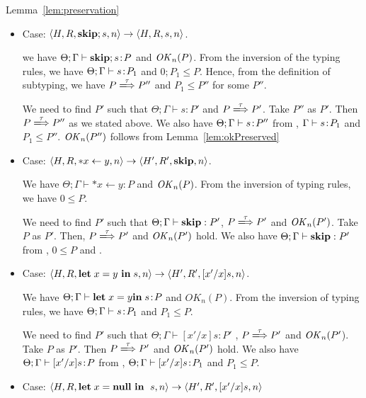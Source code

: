 \begin{pfof}{Lemma~\ref{lem:preservation}}
\begin{itemize}
\item Case: $\langle H, R, \mathbf{skip};s, n \rangle \rightarrow \langle
  H, R, s, n \rangle $.

  we have \(\Theta;\Gamma \vdash \mathbf{skip};s\!:\!  P\) and
  \(\mathit{OK}_{n}(P)\). From the inversion of the typing rules, we have
  \(\Theta; \Gamma \vdash s\!:\! P_{1}\) and \(0;P_{1} \le
  P\). Hence, from the definition of subtyping, we have \(P
  \xLongrightarrow{\tau} P''\) and \(P_{1} \le P''\) for some \(P''\).

  We need to find \(P'\) such that \(\Theta; \Gamma \vdash s : P'\)
  and \(P \xLongrightarrow{\tau} P'\). Take \(P''\) as \(P'\). Then \(P
  \xLongrightarrow{\tau} P''\) as we stated above. We also have
  \(\Theta;\Gamma \vdash s\!:\! P''\) from , \(\Gamma \vdash
  s\!:\! P_{1}\) and \(P_{1} \le P''\). \(\mathit{OK}_n(P'')\) follows from
  Lemma~\ref{lem:okPreserved}

\item Case: $\langle H, R, *x \leftarrow y , n \rangle \rightarrow
  \langle H', R', \mathbf{skip}, n \rangle $.

  We have \(\Theta; \Gamma \vdash *x \leftarrow y : P\) and
  \(\mathit{OK}_{n}(P)\). From the inversion of typing rules, we have \(0 \le
  P\).

  We need to find $P'$ such that \(\Theta; \Gamma \vdash \mathbf{skip}: P'\),
  \(P \xLongrightarrow{\tau} P'\) and \(\mathit{OK}_n(P')\). Take $P$ as $P'$. Then,
  \(P \xLongrightarrow{\tau} P'\) and \(\mathit{OK}_n(P')\) hold. We also have \(\Theta;
  \Gamma \vdash \mathbf{skip}: P'\) from , \(0 \le P\) and
  .

\item Case: $\langle H, R, \mathbf{let}\; x = y\ \mathbf{in}\; s , n \rangle
  \rightarrow \langle H', R', [x'/x]s, n \rangle $.

  We have \(\Theta; \Gamma \vdash \mathbf{let}\; x = y \mathbf{in}\; s \!:\! P\) and
  \(OK_{n}(P)\). From the inversion of typing rules, we have \(\Theta;
  \Gamma \vdash s\!:\! P_{1}\) and \(P_{1} \le P\).

  We need to find $P'$ such that \(\Theta; \Gamma \vdash [x'/x]s : P'\) ,
  \(P \xLongrightarrow{\tau} P'\) and \(\mathit{OK}_n(P'\)). Take \(P\) as
  \(P'\). Then \( P \xLongrightarrow{\tau} P'\) and \(\mathit{OK}_n(P')\) hold.  We
  also have \(\Theta; \Gamma \vdash [x'/x]s\!:\! P\) from ,
  \(\Theta; \Gamma \vdash [x'/x]s\!:\! P_{1}\) and \( P_{1} \le
  P\).

\item Case: $\langle H, R, \LET x = \NULL \ \IN \ s, n \rangle
  \rightarrow \langle H', R', [x'/x]s, n \rangle $


\end{itemize}
\end{pfof}
